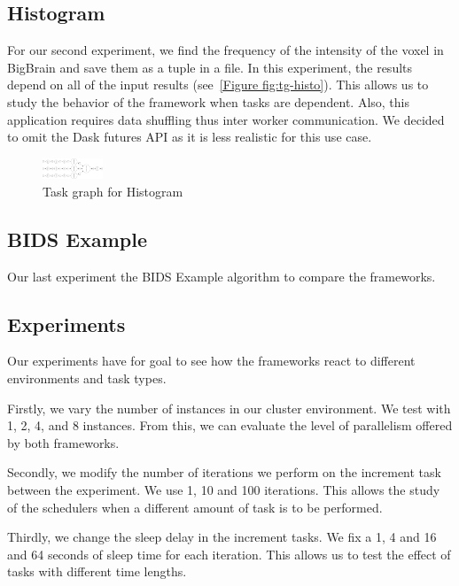 \documentclass[conference]{IEEEtran}
\begin{document}
\subsection{Histogram}
For our second experiment, we find the frequency of the intensity of the voxel in
BigBrain and save them as a tuple in a file. In this experiment, the results depend
on all of the input results (see~\ref{Figure fig:tg-histo}). This allows us to study
the behavior of the framework when tasks are dependent. Also, this application
requires data shuffling thus inter worker communication. We decided to omit the Dask
futures API as it is less realistic for this use case.

\begin{figure}[!t]
    \centering
    \includegraphics[width=0.16\textwidth, angle=-90]{images/histogram-task-graph.png}
    \caption{Task graph for Histogram}\label{fig:tg-histo}
\end{figure}

\subsection{BIDS Example}
Our last experiment the BIDS Example algorithm to compare the frameworks.


\subsection{Experiments}
Our experiments have for goal to see how the frameworks react to different
environments and task types.

Firstly, we vary the number of instances in our cluster environment. We test with 1,
2, 4, and 8 instances. From this, we can evaluate the level of parallelism offered by
both frameworks.

Secondly, we modify the number of iterations we perform on the increment task between
the experiment. We use 1, 10 and 100 iterations. This allows the study of the
schedulers when a different amount of task is to be performed.

Thirdly, we change the sleep delay in the increment tasks. We fix a 1, 4 and 16 and
64 seconds of sleep time for each iteration. This allows us to test the effect of
tasks with different time lengths.
\end{document}
